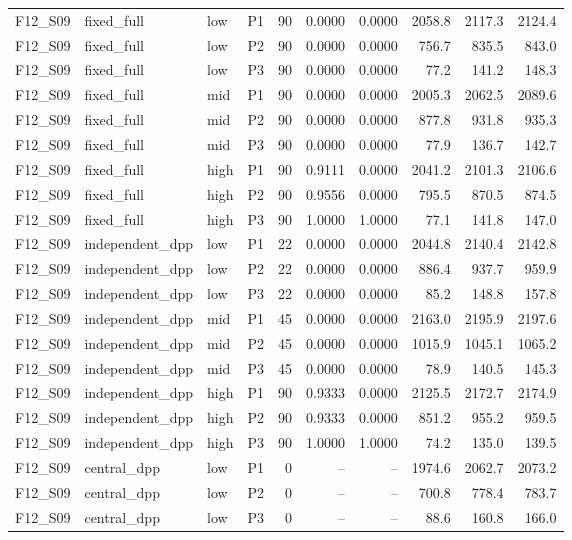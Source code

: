 \begin{longtable}{llllrrrrrr}
F12\_S09 & fixed\_full & low & P1 & 90 & 0.0000 & 0.0000 & 2058.8 & 2117.3 & 2124.4 \\
F12\_S09 & fixed\_full & low & P2 & 90 & 0.0000 & 0.0000 & 756.7 & 835.5 & 843.0 \\
F12\_S09 & fixed\_full & low & P3 & 90 & 0.0000 & 0.0000 & 77.2 & 141.2 & 148.3 \\
F12\_S09 & fixed\_full & mid & P1 & 90 & 0.0000 & 0.0000 & 2005.3 & 2062.5 & 2089.6 \\
F12\_S09 & fixed\_full & mid & P2 & 90 & 0.0000 & 0.0000 & 877.8 & 931.8 & 935.3 \\
F12\_S09 & fixed\_full & mid & P3 & 90 & 0.0000 & 0.0000 & 77.9 & 136.7 & 142.7 \\
F12\_S09 & fixed\_full & high & P1 & 90 & 0.9111 & 0.0000 & 2041.2 & 2101.3 & 2106.6 \\
F12\_S09 & fixed\_full & high & P2 & 90 & 0.9556 & 0.0000 & 795.5 & 870.5 & 874.5 \\
F12\_S09 & fixed\_full & high & P3 & 90 & 1.0000 & 1.0000 & 77.1 & 141.8 & 147.0 \\
F12\_S09 & independent\_dpp & low & P1 & 22 & 0.0000 & 0.0000 & 2044.8 & 2140.4 & 2142.8 \\
F12\_S09 & independent\_dpp & low & P2 & 22 & 0.0000 & 0.0000 & 886.4 & 937.7 & 959.9 \\
F12\_S09 & independent\_dpp & low & P3 & 22 & 0.0000 & 0.0000 & 85.2 & 148.8 & 157.8 \\
F12\_S09 & independent\_dpp & mid & P1 & 45 & 0.0000 & 0.0000 & 2163.0 & 2195.9 & 2197.6 \\
F12\_S09 & independent\_dpp & mid & P2 & 45 & 0.0000 & 0.0000 & 1015.9 & 1045.1 & 1065.2 \\
F12\_S09 & independent\_dpp & mid & P3 & 45 & 0.0000 & 0.0000 & 78.9 & 140.5 & 145.3 \\
F12\_S09 & independent\_dpp & high & P1 & 90 & 0.9333 & 0.0000 & 2125.5 & 2172.7 & 2174.9 \\
F12\_S09 & independent\_dpp & high & P2 & 90 & 0.9333 & 0.0000 & 851.2 & 955.2 & 959.5 \\
F12\_S09 & independent\_dpp & high & P3 & 90 & 1.0000 & 1.0000 & 74.2 & 135.0 & 139.5 \\
F12\_S09 & central\_dpp & low & P1 & 0 & -- & -- & 1974.6 & 2062.7 & 2073.2 \\
F12\_S09 & central\_dpp & low & P2 & 0 & -- & -- & 700.8 & 778.4 & 783.7 \\
F12\_S09 & central\_dpp & low & P3 & 0 & -- & -- & 88.6 & 160.8 & 166.0 \\

\end{longtable}
